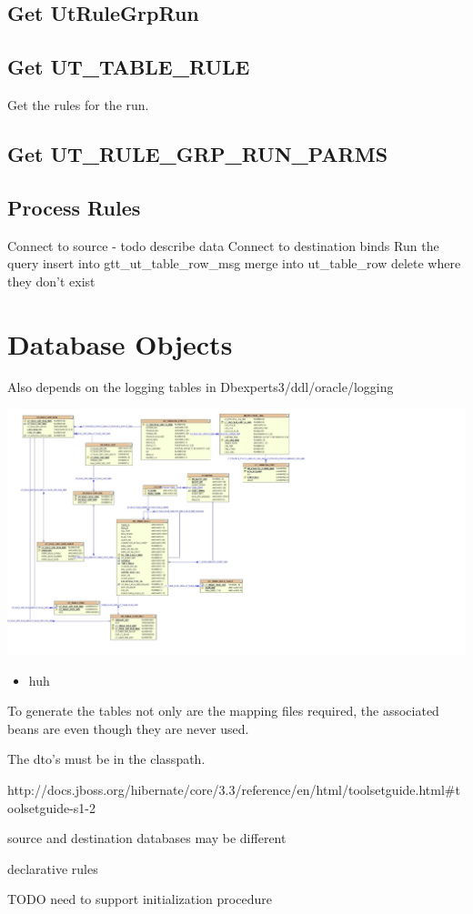 \documentclass[a4paper,10pt]{book}
\begin{document}
\section{Get UtRuleGrpRun}
\section{Get UT_TABLE_RULE}
Get the rules for the run.
\section{Get UT_RULE_GRP_RUN_PARMS}
\section{Process Rules}
Connect to source - todo describe data
Connect to destination
binds
Run the query
insert into gtt_ut_table_row_msg
merge into ut_table_row
delete where they don't exist
\chapter {Database Objects}
Also depends on the logging tables in Dbexperts3/ddl/oracle/logging

\includegraphics*[width=\textwidth,viewport=0 0 3046 1632, bb=0 0 3046 1632]{ExceptionProcessing.jpeg}

\begin{itemize}
	\item huh
\end{itemize}

To generate the tables not only are the mapping files required, the associated beans are even though they are 
never used. 

The dto's must be in the classpath.

http://docs.jboss.org/hibernate/core/3.3/reference/en/html/toolsetguide.html#toolsetguide-s1-2




source and destination databases may be different 

declarative rules

TODO need to support initialization procedure
\end{document}
